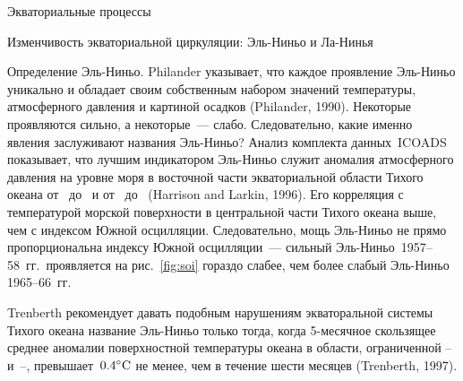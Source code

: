 \begin{chapter}{Экваториальные процессы}
\begin{section}{Изменчивость экваториальной циркуляции: Эль-Ниньо и Ла-Нинья}
\begin{paragraph}{Определение Эль-Ниньо.}
%
Philander указывает, что каждое проявление Эль-Ниньо уникально и обладает
своим собственным набором значений температуры, атмосферного давления и
картиной осадков (Philander, 1990). 
Некоторые проявляются сильно, а некоторые~--- слабо. Следовательно, какие
именно явления заслуживают названия Эль-Ниньо? Анализ комплекта данных~ICOADS%
показывает, что лучшим индикатором Эль-Ниньо служит аномалия атмосферного 
давления на уровне моря в восточной части экваториальной области Тихого океана
от~ до~ и от~ до~ 
(Harrison and Larkin, 1996). Его корреляция с температурой морской поверхности
в центральной части Тихого океана выше, чем с индексом Южной осцилляции.
Следовательно, мощь Эль-Ниньо не прямо пропорциональна индексу Южной
осцилляции~--- сильный Эль-Ниньо~1957--58~гг.\
проявляется на рис.~\ref{fig:soi} гораздо слабее, чем более слабый Эль-Ниньо
1965--66~гг.
%

Trenberth рекомендует давать подобным нарушениям экваторальной системы
Тихого океана название Эль-Ниньо только тогда, когда 5-месячное скользящее 
среднее аномалии поверхностной температуры океана%
 в области, ограниченной
\latlon{5}{N}--\latlon{5}{S} и~\latlon{120}{W}--\latlon{170}{W}, 
превышает~${0.4}^\circ\mbox{C}$ не менее, чем в течение шести месяцев (Trenberth, 1997).
%


\end{paragraph}
\end{section}
\end{chapter}
